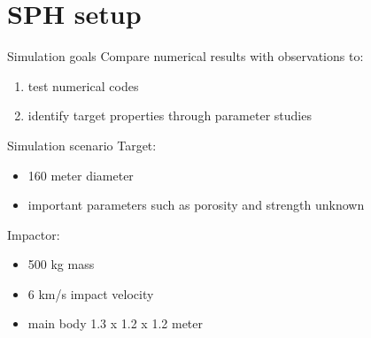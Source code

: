 \documentclass{beamer}
\begin{document}
\section{SPH setup}
\begin{frame}{Simulation goals}
Compare numerical results with observations to:
\begin{enumerate}
	\item test numerical codes \pause
	\item identify target properties through parameter studies
\end{enumerate}
\end{frame}

\begin{frame}{Simulation scenario}
Target:
\begin{itemize}
	\item 160 meter diameter \pause
	\item important parameters such as porosity and strength unknown \pause
\end{itemize} 
Impactor:
\begin{itemize}
	\item 500 kg mass \pause
	\item 6 km/s impact velocity \pause
	\item main body 1.3 x 1.2 x 1.2 meter \pause
\end{itemize} 
\end{frame}
\end{document}

